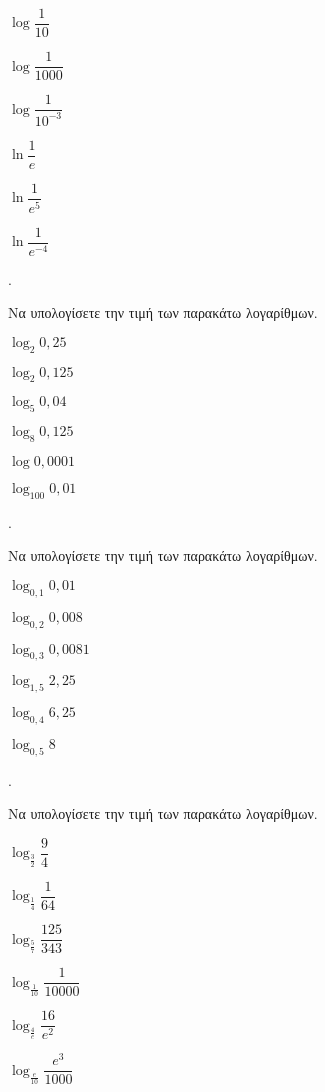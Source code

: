 \documentclass[11pt,a4paper,twocolumn]{article}
\newcounter{askhsh}
\newcommand{\askhsh}{\large\theaskhsh.\ \addtocounter{askhsh}{1}}
\begin{document}
\begin{multicols}{3}
\begin{alist}
\item $ \log{\dfrac{1}{10}} $
\item $ \log{\dfrac{1}{1000}} $
\item $ \log{\dfrac{1}{10^{-3}}} $
\item $ \ln{\dfrac{1}{e}} $
\item $ \ln{\dfrac{1}{e^5}} $
\item $ \ln{\dfrac{1}{e^{-4}}} $
\end{alist}
\end{multicols}
\askhsh Να υπολογίσετε την τιμή των παρακάτω λογαρίθμων.
\begin{multicols}{3}
\begin{alist}
\item $ \log_{2}{0{,}25} $
\item $ \log_{2}{0{,}125} $
\item $ \log_{5}{0{,}04} $
\item $ \log_{8}{0{,}125} $
\item $ \log{0{,}0001} $
\item $ \log_{100}{0{,}01} $
\end{alist}
\end{multicols}
\askhsh Να υπολογίσετε την τιμή των παρακάτω λογαρίθμων.
\begin{multicols}{3}
\begin{alist}[leftmargin=4mm]
\item $ \log_{0{,}1}{0{,}01} $
\item $ \log_{0{,}2}{0{,}008} $
\item $ \log_{0{,}3}{0{,}0081} $
\item $ \log_{1{,}5}{2{,}25} $
\item $ \log_{0{,}4}{6{,}25} $
\item $ \log_{0{,}5}{8} $
\end{alist}
\end{multicols}
\askhsh Να υπολογίσετε την τιμή των παρακάτω λογαρίθμων.
\begin{multicols}{3}
\begin{alist}[leftmargin=4mm]
\item $ \log_{\frac{3}{2}}{\dfrac{9}{4}} $
\item $ \log_{\frac{1}{4}}{\dfrac{1}{64}} $
\item $ \log_{\frac{5}{7}}{\dfrac{125}{343}} $
\item $ \log_{\frac{1}{10}}{\dfrac{1}{10000}} $
\item $ \log_{\frac{4}{e}}{\dfrac{16}{e^2}} $
\item $ \log_{\frac{e}{10}}{\dfrac{e^3}{1000}} $
\end{alist}
\end{multicols}
\end{document}
